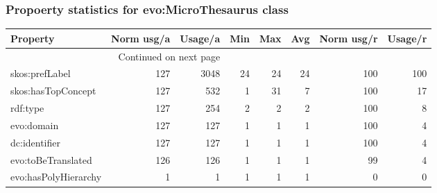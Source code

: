 \documentclass[10pt,a4paper,titlepage,final]{article}
\begin{document}
\subsubsection{Propoerty statistics for evo:MicroThesaurus class}
\begin{longtable}{lrrrrrrr}
\toprule
             Property &  Norm usg/a &  Usage/a &  Min &  Max &  Avg &  Norm usg/r &  Usage/r \\
\midrule
\endhead
\midrule
\multicolumn{3}{r}{{Continued on next page}} \\
\midrule
\endfoot

\bottomrule
\endlastfoot
       skos:prefLabel &         127 &     3048 &   24 &   24 &   24 &         100 &      100 \\
   skos:hasTopConcept &         127 &      532 &    1 &   31 &    7 &         100 &       17 \\
             rdf:type &         127 &      254 &    2 &    2 &    2 &         100 &        8 \\
           evo:domain &         127 &      127 &    1 &    1 &    1 &         100 &        4 \\
        dc:identifier &         127 &      127 &    1 &    1 &    1 &         100 &        4 \\
   evo:toBeTranslated &         126 &      126 &    1 &    1 &    1 &          99 &        4 \\
 evo:hasPolyHierarchy &           1 &        1 &    1 &    1 &    1 &           0 &        0 \\
\end{longtable}
\end{document}
